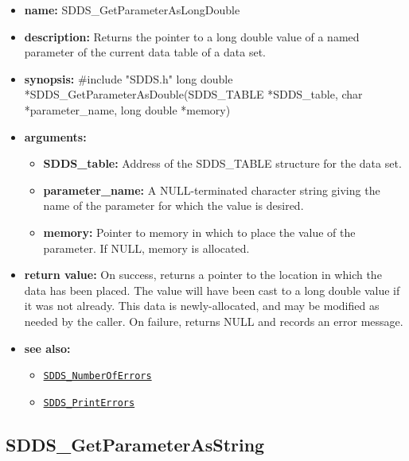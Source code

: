 \documentclass[11pt]{article}
\newcommand{\progref}[1]{\hyperref[SDDS_#1]{\tt SDDS\_#1}}
\begin{document}
\begin{itemize}
\item {\bf name:}\newline
SDDS\_GetParameterAsLongDouble
\item {\bf description:}\newline
Returns the pointer to a long double value of a named parameter of the current data table of a data set.
\item {\bf synopsis:} \#include "SDDS.h"\newline
long double *SDDS\_GetParameterAsDouble(SDDS\_TABLE *SDDS\_table, char *parameter\_name, long double *memory)
\item {\bf arguments:}
\begin{itemize}
\item {\bf SDDS\_table:} Address of the SDDS\_TABLE structure for the data set.
\item {\bf parameter\_name:} A NULL-terminated character string giving the name of the parameter for which the value is desired.
\item {\bf memory:} Pointer to memory in which to place the value of the parameter. If NULL, memory is allocated.
\end{itemize}
\item {\bf return value:}\newline
On success, returns a pointer to the location in which the data has been placed. The value will have been cast to a long double value if it was not already. This data is newly-allocated, and may be modified as needed by the caller. On failure, returns NULL and records an error message.
\item {\bf see also:}
\begin{itemize}
\item \progref{NumberOfErrors}
\item \progref{PrintErrors}
\end{itemize}
\end{itemize}

\subsection{SDDS\_GetParameterAsString}
\label{SDDS_GetParameterAsString}
\end{document}
